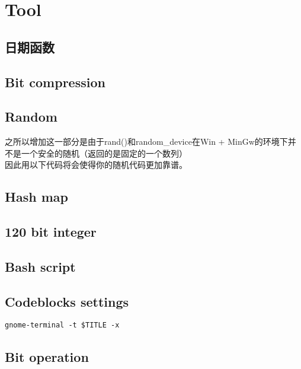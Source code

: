 \section{Tool}
\subsection{日期函数}

\subsection{Bit compression}

\subsection{Random}

之所以增加这一部分是由于rand()和random\_device在Win + MinGw的环境下并不是一个安全的随机（返回的是固定的一个数列）\\ 因此用以下代码将会使得你的随机代码更加靠谱。\\


\subsection{Hash map}

\subsection{120 bit integer}

\subsection{Bash script}

\subsection{Codeblocks settings}
	\begin{lstlisting}
gnome-terminal -t $TITLE -x
	\end{lstlisting}
\subsection{Bit operation}
